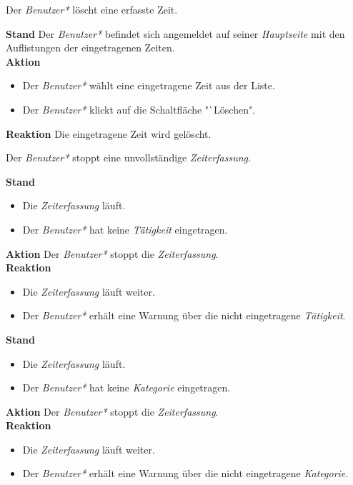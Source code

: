 \begin{requirements}
     Der \emph{Benutzer*} löscht eine erfasste Zeit.
    \begin{requirements}
            \textbf{Stand} Der \emph{Benutzer*} befindet sich angemeldet auf seiner \emph{Hauptseite} mit den Auflistungen der eingetragenen Zeiten. \\
            \textbf{Aktion}
                \begin{itemize}
                    \item Der \emph{Benutzer*} wählt eine eingetragene Zeit aus der Liste.
                    \item Der \emph{Benutzer*} klickt auf die Schaltfläche "`Löschen".
                \end{itemize}
            \textbf{Reaktion} Die eingetragene Zeit wird gelöscht.
    \end{requirements}
    
\newpage
     Der \emph{Benutzer*} stoppt eine unvollständige \emph{Zeiterfassung}.
    \begin{requirements}
            \textbf{Stand}
            \begin{itemize}
                \item Die \emph{Zeiterfassung} läuft.
                \item Der \emph{Benutzer*} hat keine \emph{Tätigkeit} eingetragen.
            \end{itemize}
            \textbf{Aktion} Der \emph{Benutzer*} stoppt die \emph{Zeiterfassung}. \\
            \textbf{Reaktion}
            \begin{itemize}
                \item Die \emph{Zeiterfassung} läuft weiter.
                \item Der \emph{Benutzer*} erhält eine Warnung über die nicht eingetragene \emph{Tätigkeit}.
            \end{itemize}
            \textbf{Stand}
            \begin{itemize}
                \item Die \emph{Zeiterfassung} läuft.
                \item Der \emph{Benutzer*} hat keine \emph{Kategorie} eingetragen.
            \end{itemize}
            \textbf{Aktion} Der \emph{Benutzer*} stoppt die \emph{Zeiterfassung}. \\
            \textbf{Reaktion}
            \begin{itemize}
                \item Die \emph{Zeiterfassung} läuft weiter.
                \item Der \emph{Benutzer*} erhält eine Warnung über die nicht eingetragene \emph{Kategorie}.
            \end{itemize}
    \end{requirements}
    

\end{requirements}

